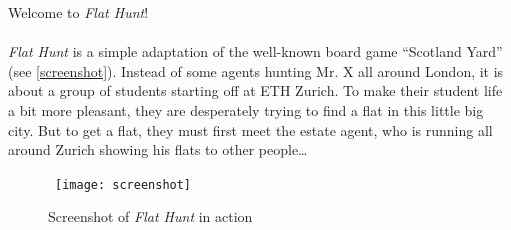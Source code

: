 Welcome to \emph{Flat Hunt}!

\paragraph{}
\emph{Flat Hunt} is a simple adaptation of the well-known board game ``Scotland Yard'' (see \autoref{screenshot}). Instead of some agents hunting Mr. X all around London, it is about a group of students starting off at ETH Zurich. To make their student life a bit more pleasant, they are desperately trying to find a flat in this little big city. But to get a flat, they must first meet the estate agent, who is running all around Zurich showing his flats to other people\ldots

\begin{figure}[h]
  \centerline{\hbox{
    \texttt{[image: screenshot]}
  }}
\caption{Screenshot of \emph{Flat Hunt} in action}
\label{screenshot}
\end{figure}
